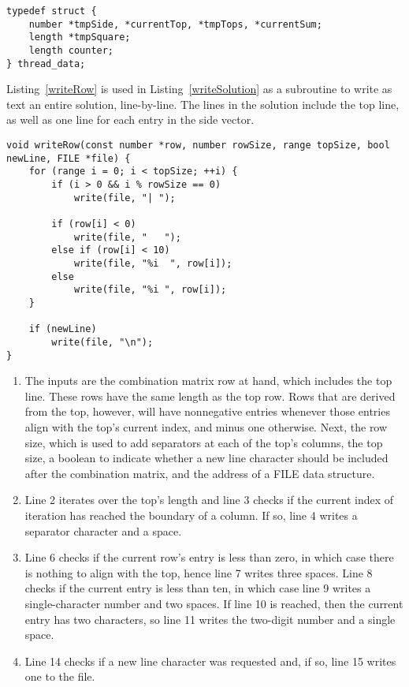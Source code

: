 \begin{lstlisting}[caption={Defining a data structure to hold thread-specific data.},label={threadSpecificDataStructure}]
typedef struct {
    number *tmpSide, *currentTop, *tmpTops, *currentSum;
    length *tmpSquare;
    length counter;
} thread_data;
\end{lstlisting}

Listing~\ref{writeRow} is used in Listing~\ref{writeSolution} as a subroutine to write as text an entire solution, line-by-line. The lines in the solution include the top line, as well as one line for each entry in the side vector.

\begin{lstlisting}[caption={Writing a single row from a combination matrix.},label={writeRow}]
void writeRow(const number *row, number rowSize, range topSize, bool newLine, FILE *file) {
    for (range i = 0; i < topSize; ++i) {
        if (i > 0 && i % rowSize == 0)
            write(file, "| ");

        if (row[i] < 0)
            write(file, "   ");
        else if (row[i] < 10)
            write(file, "%i  ", row[i]);
        else
            write(file, "%i ", row[i]);
    }

    if (newLine)
        write(file, "\n");
}
\end{lstlisting}

\begin{enumerate}
\item The inputs are the combination matrix row at hand, which includes the top line. These rows have the same length as the top row. Rows that are derived from the top, however, will have nonnegative entries whenever those entries align with the top's current index, and minus one otherwise. Next, the row size, which is used to add separators at each of the top's columns, the top size, a boolean to indicate whether a new line character should be included after the combination matrix, and the address of a FILE data structure.
\item Line 2 iterates over the top's length and line 3 checks if the current index of iteration has reached the boundary of a column. If so, line 4 writes a separator character and a space.
\addtocounter{enumi}{3}
\item Line 6 checks if the current row's entry is less than zero, in which case there is nothing to align with the top, hence line 7 writes three spaces. Line 8 checks if the current entry is less than ten, in which case line 9 writes a single-character number and two spaces. If line 10 is reached, then the current entry has two characters, so line 11 writes the two-digit number and a single space.
\addtocounter{enumi}{7}
\item Line 14 checks if a new line character was requested and, if so, line 15 writes one to the file.
\end{enumerate}

